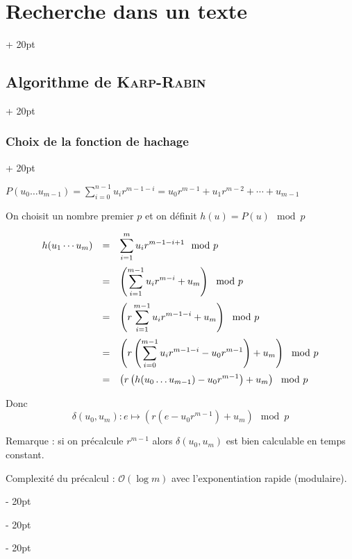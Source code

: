 \documentclass[a4paper, 12pt, twoside]{article}
\newcommand{\lr}[1]{\left( #1 \right)}
\newcommand{\ind}[1][20pt]{\advance\leftskip + #1}
\newcommand{\deind}[1][20pt]{\advance\leftskip - #1}
\newenvironment{indt}[2][20pt]{#2 \par \ind[#1]}{\par \deind} %
\begin{document}
\begin{indt}{\section{Recherche dans un texte}}
\begin{indt}{\subsection{Algorithme de \textsc{Karp-Rabin}}}
\begin{indt}{\subsubsection{Choix de la fonction de hachage}}
                \vspace{12pt}
                
                $
                    P(u_0 \ldots u_{m - 1}) = \displaystyle
                    \sum_{i = 0}^{n - 1} u_i r^{m - 1 - i}
                    = u_0r^{m - 1} + u_1 r^{m - 2} + \cdots + u_{m - 1}
                $

                On choisit un nombre premier $p$ et on définit $h(u) = P(u) \mod p$

                \[
                    \begin{array}{rcl}
                        h(u_1 \cdots u_m)
                        &=& \displaystyle
                        \sum_{i = 1}^m u_i r^{m - 1 - i + 1} \mod p
                        \vspace{6pt}
                        \\
                        &=& \displaystyle
                        \lr{\sum_{i = 1}^{m - 1} u_i r^{m - i} + u_m} \mod p
                        \vspace{6pt}
                        \\
                        &=& \displaystyle
                        \lr{r\sum_{i = 1}^{m - 1} u_i r^{m - 1 - i} + u_m} \mod p
                        \vspace{6pt}
                        \\
                        &=& \displaystyle
                        \lr{r\lr{\sum_{i = 0}^{m - 1} u_i r^{m - 1 - i} - u_0 r^{m - 1}} + u_m} \mod p
                        \vspace{6pt}
                        \\
                        &=& \displaystyle
                        \lr{r\lr{h(u_0 \ldots u_{m - 1}) - u_0 r^{m - 1}} + u_m} \mod p
                    \end{array}
                \]
                
                Donc
                \[
                    \delta(u_0, u_m) : e \longmapsto \lr{r \lr{e - u_0 r^{m - 1}} + u_m} \mod p
                \]

                Remarque : si on précalcule $r^{m - 1}$ alors $\delta(u_0, u_m)$ est bien calculable en temps constant.

                Complexité du précalcul : $\mathcal O(\log m)$ avec l'exponentiation rapide (modulaire).
            \end{indt}

            \vspace{12pt}
            

\end{indt}
\end{indt}
\end{document}

